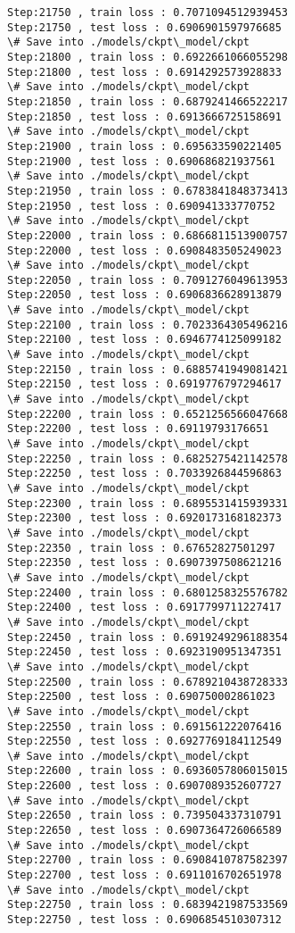 \documentclass[11pt]{article}
\begin{document}
\begin{Verbatim}[commandchars=\\\{\}]
Step:21750 , train loss : 0.7071094512939453
Step:21750 , test loss : 0.6906901597976685
\# Save into ./models/ckpt\_model/ckpt
Step:21800 , train loss : 0.6922661066055298
Step:21800 , test loss : 0.6914292573928833
\# Save into ./models/ckpt\_model/ckpt
Step:21850 , train loss : 0.6879241466522217
Step:21850 , test loss : 0.6913666725158691
\# Save into ./models/ckpt\_model/ckpt
Step:21900 , train loss : 0.695633590221405
Step:21900 , test loss : 0.690686821937561
\# Save into ./models/ckpt\_model/ckpt
Step:21950 , train loss : 0.6783841848373413
Step:21950 , test loss : 0.690941333770752
\# Save into ./models/ckpt\_model/ckpt
Step:22000 , train loss : 0.6866811513900757
Step:22000 , test loss : 0.6908483505249023
\# Save into ./models/ckpt\_model/ckpt
Step:22050 , train loss : 0.7091276049613953
Step:22050 , test loss : 0.6906836628913879
\# Save into ./models/ckpt\_model/ckpt
Step:22100 , train loss : 0.7023364305496216
Step:22100 , test loss : 0.6946774125099182
\# Save into ./models/ckpt\_model/ckpt
Step:22150 , train loss : 0.6885741949081421
Step:22150 , test loss : 0.6919776797294617
\# Save into ./models/ckpt\_model/ckpt
Step:22200 , train loss : 0.6521256566047668
Step:22200 , test loss : 0.69119793176651
\# Save into ./models/ckpt\_model/ckpt
Step:22250 , train loss : 0.6825275421142578
Step:22250 , test loss : 0.7033926844596863
\# Save into ./models/ckpt\_model/ckpt
Step:22300 , train loss : 0.6895531415939331
Step:22300 , test loss : 0.6920173168182373
\# Save into ./models/ckpt\_model/ckpt
Step:22350 , train loss : 0.67652827501297
Step:22350 , test loss : 0.6907397508621216
\# Save into ./models/ckpt\_model/ckpt
Step:22400 , train loss : 0.6801258325576782
Step:22400 , test loss : 0.6917799711227417
\# Save into ./models/ckpt\_model/ckpt
Step:22450 , train loss : 0.6919249296188354
Step:22450 , test loss : 0.6923190951347351
\# Save into ./models/ckpt\_model/ckpt
Step:22500 , train loss : 0.6789210438728333
Step:22500 , test loss : 0.690750002861023
\# Save into ./models/ckpt\_model/ckpt
Step:22550 , train loss : 0.691561222076416
Step:22550 , test loss : 0.6927769184112549
\# Save into ./models/ckpt\_model/ckpt
Step:22600 , train loss : 0.6936057806015015
Step:22600 , test loss : 0.6907089352607727
\# Save into ./models/ckpt\_model/ckpt
Step:22650 , train loss : 0.739504337310791
Step:22650 , test loss : 0.6907364726066589
\# Save into ./models/ckpt\_model/ckpt
Step:22700 , train loss : 0.6908410787582397
Step:22700 , test loss : 0.6911016702651978
\# Save into ./models/ckpt\_model/ckpt
Step:22750 , train loss : 0.6839421987533569
Step:22750 , test loss : 0.6906854510307312

\end{Verbatim}
\end{document}
